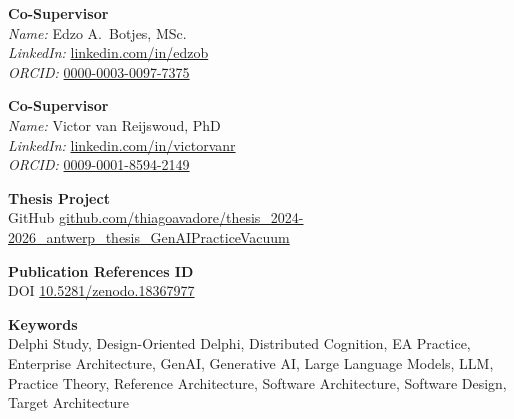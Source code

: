 {\vspace{0.2cm}

\noindent\hspace{0.2cm}\textbf{Co-Supervisor}\\
\noindent\hspace{0.2cm}\textit{Name:} Edzo A.\ Botjes, MSc.\\
\noindent\hspace{0.2cm}\textit{LinkedIn:} \href{https://www.linkedin.com/in/edzob/}{linkedin.com/in/edzob}\\
\noindent\hspace{0.2cm}\textit{ORCID:} \href{https://orcid.org/0000-0003-0097-7375}{0000-0003-0097-7375}

\vspace{0.2cm}

\noindent\hspace{0.2cm}\textbf{Co-Supervisor}\\
\noindent\hspace{0.2cm}\textit{Name:} Victor van Reijswoud, PhD\\
\noindent\hspace{0.2cm}\textit{LinkedIn:} \href{https://www.linkedin.com/in/victorvanr/}{linkedin.com/in/victorvanr}\\
\noindent\hspace{0.2cm}\textit{ORCID:} \href{https://orcid.org/0009-0001-8594-2149}{0009-0001-8594-2149}

\vspace{0.2cm}

\noindent\hspace{0.2cm}\textbf{Thesis Project}\\
\noindent\hspace{0.2cm}GitHub \href{https://github.com/thiagoavadore/thesis_2024-2026_antwerp_thesis_GenAIPracticeVacuum}{github.com/thiagoavadore/thesis\_2024-2026\_antwerp\_thesis\_GenAIPracticeVacuum}

\vspace{0.2cm}

\noindent\hspace{0.2cm}\textbf{Publication References ID}\\
\noindent\hspace{0.2cm}DOI \href{https://doi.org/10.5281/zenodo.18367977}{10.5281/zenodo.18367977}

\vspace{0.2cm}

\noindent\hspace{0.2cm}\textbf{Keywords}\\
\noindent\hspace{0.2cm}Delphi Study, Design-Oriented Delphi, Distributed Cognition, EA Practice,\\
\noindent\hspace{0.2cm}Enterprise Architecture, GenAI, Generative AI, Large Language Models, LLM,\\
\noindent\hspace{0.2cm}Practice Theory, Reference Architecture, Software Architecture, Software Design,\\
\noindent\hspace{0.2cm}Target Architecture

}
